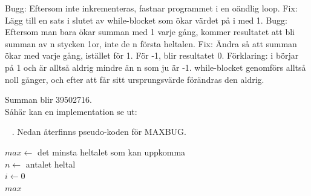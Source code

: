 \SOLUTION


\TaskSolved \what


\SubtaskSolved  Bugg: Eftersom  inte inkrementeras, fastnar programmet i en oändlig loop. Fix: Lägg till en sats i slutet av while-blocket som ökar värdet på i med 1.
Bugg: Eftersom man bara ökar summan med 1 varje gång, kommer resultatet att bli summan av n stycken 1or, inte de n första heltalen. Fix: Ändra så att summan ökar med  varje gång, istället för 1.
För -1, blir resultatet 0. Förklaring: i börjar på 1 och är alltså aldrig mindre än n som ju är -1. while-blocket genomförs alltså noll gånger, och efter att  får sitt ursprungsvärde förändras den aldrig.

\SubtaskSolved Summan blir 39502716.\\
Såhär kan en implementation se ut:




\QUESTEND



\clearpage

\ExtraTasks %





\QUESTBEGIN

\Task  \what~ . Nedan återfinns pseudo-koden för MAXBUG.

\begin{algorithm}[H]

$max \leftarrow$ det minsta heltalet som kan uppkomma  \\
$n \leftarrow $ antalet heltal \\
$i \leftarrow 0$ \\
$max$
\end{algorithm}

